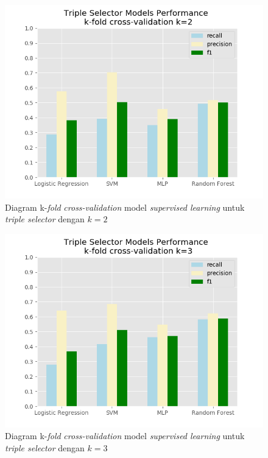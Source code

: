 \begin{figure}
	\includegraphics[width=\textwidth]{../images/models_performance_k_2.png}
	\caption{Diagram k-\textit{fold} \textit{cross-validation} model \textit{supervised learning} untuk \textit{triple selector} dengan $k=2$}
	\label{fig:models_performance_k_2}
\end{figure}

\begin{figure}
	\includegraphics[width=\textwidth]{../images/models_performance_k_3.png}
	\caption{Diagram k-\textit{fold} \textit{cross-validation} model \textit{supervised learning} untuk \textit{triple selector} dengan $k=3$}
	\label{fig:models_performance_k_3}
\end{figure}


